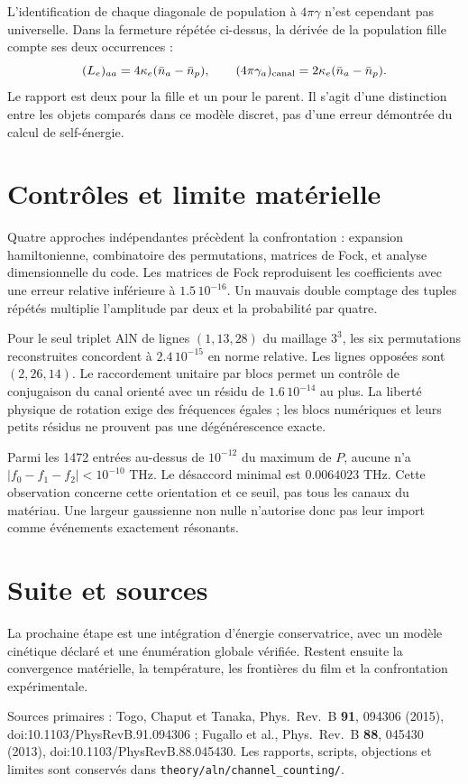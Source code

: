 \documentclass[11pt,a4paper]{article}
\begin{document}
L'identification de chaque diagonale de population à $4\pi\gamma$
n'est cependant pas universelle. Dans la fermeture répétée ci-dessus,
la dérivée de la population fille compte ses deux occurrences :
\[
 (L_e)_{aa}=4\kappa_e(\bar n_a-\bar n_p),\qquad
 (4\pi\gamma_a)_{\rm canal}=2\kappa_e(\bar n_a-\bar n_p).
\]
Le rapport est deux pour la fille et un pour le parent. Il s'agit
d'une distinction entre les objets comparés dans ce modèle discret,
pas d'une erreur démontrée du calcul de self-énergie.

\section{Contrôles et limite matérielle}
Quatre approches indépendantes précèdent la confrontation : expansion
hamiltonienne, combinatoire des permutations, matrices de Fock, et
analyse dimensionnelle du code. Les matrices de Fock reproduisent les
coefficients avec une erreur relative inférieure à $1.5\,10^{-16}$.
Un mauvais double comptage des tuples répétés multiplie l'amplitude
par deux et la probabilité par quatre.

Pour le seul triplet AlN de lignes $(1,13,28)$ du maillage $3^3$,
les six permutations reconstruites concordent à $2.4\,10^{-15}$
en norme relative. Les lignes opposées sont $(2,26,14)$.
Le raccordement unitaire par blocs permet un contrôle de conjugaison
du canal orienté avec un résidu de $1.6\,10^{-14}$ au plus.
La liberté physique de rotation exige des fréquences égales ; les blocs
numériques et leurs petits résidus ne prouvent pas une dégénérescence exacte.

Parmi les 1472 entrées au-dessus de $10^{-12}$ du maximum de $P$,
aucune n'a $|f_0-f_1-f_2|<10^{-10}$ THz. Le désaccord minimal est
$0.0064023$ THz. Cette observation concerne cette orientation et ce seuil,
pas tous les canaux du matériau. Une largeur gaussienne non nulle
n'autorise donc pas leur import comme événements exactement résonants.

\section{Suite et sources}
La prochaine étape est une intégration d'énergie conservatrice,
avec un modèle cinétique déclaré et une énumération globale vérifiée.
Restent ensuite la convergence matérielle, la température, les frontières
du film et la confrontation expérimentale.

Sources primaires : Togo, Chaput et Tanaka, Phys.\ Rev.\ B
\textbf{91}, 094306 (2015), doi:10.1103/\allowbreak PhysRevB.91.094306 ;
Fugallo et al., Phys.\ Rev.\ B \textbf{88}, 045430 (2013),
doi:10.1103/\allowbreak PhysRevB.88.045430.
Les rapports, scripts, objections et limites sont conservés dans
\texttt{theory/aln/channel\_counting/}.
\end{document}
